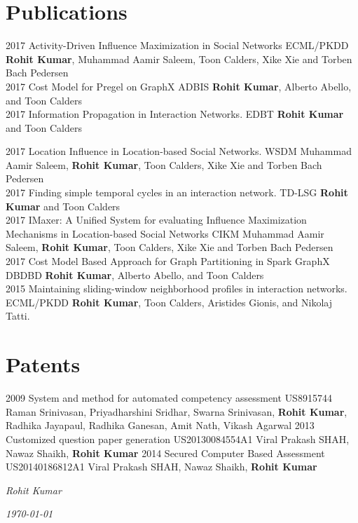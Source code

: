 \documentclass[]{cv-class}
\begin{document}
\section{Publications}
\begin{entrylist}
	\entry
	{2017}
	{Activity-Driven Influence Maximization in Social Networks}
	{ECML/PKDD}
	{\textbf{Rohit Kumar}, Muhammad Aamir Saleem, Toon Calders, Xike Xie and Torben Bach Pedersen\\}
	\entry
	{2017}
	{Cost Model for Pregel on GraphX}
	{ADBIS}
	{\textbf{Rohit Kumar}, Alberto Abello, and Toon Calders\\}
		\entry
	{2017}
	{Information Propagation in Interaction Networks.}
	{EDBT}
	{\textbf{Rohit Kumar} and Toon Calders\\}
		
	\end{entrylist}
	\begin{entrylist}
	\entry
	{2017}
	{Location Influence in Location-based Social Networks.}
	{WSDM}
	{Muhammad Aamir Saleem, \textbf{Rohit Kumar}, Toon Calders, Xike Xie and Torben Bach Pedersen\\}
	\entry
	{2017}
	{Finding simple temporal cycles in an interaction network.}
	{TD-LSG}
	{\textbf{Rohit Kumar} and Toon Calders\\}
	\entry
	{2017}
	{IMaxer: A Unified System for evaluating Influence Maximization Mechanisms in Location-based Social Networks}
	{CIKM}
	{Muhammad Aamir Saleem, \textbf{Rohit Kumar}, Toon Calders, Xike Xie and Torben Bach Pedersen\\}
	\entry
	{2017}
	{Cost Model Based Approach for Graph Partitioning in Spark GraphX}
	{DBDBD}
	{\textbf{Rohit Kumar}, Alberto Abello, and Toon Calders\\}
	\entry
	{2015}
	{Maintaining sliding-window neighborhood profiles in interaction networks.}
	{ECML/PKDD}
	{\textbf{Rohit Kumar}, Toon Calders, Aristides Gionis, and Nikolaj Tatti.\\}
	\end{entrylist}
	\section{Patents}
	\begin{entrylist}
	\entry
	{2009}
	{System and method for automated competency assessment}
	{US8915744}
	{Raman Srinivasan, Priyadharshini Sridhar, Swarna Srinivasan, \textbf{Rohit Kumar}, Radhika Jayapaul, Radhika Ganesan, Amit Nath, Vikash Agarwal}
	\entry
	{2013}
	{Customized question paper generation}
	{US20130084554A1}
	{Viral Prakash SHAH, Nawaz Shaikh,\textbf{ Rohit Kumar}}
	\entry
	{2014}
	{Secured Computer Based Assessment}
	{US20140186812A1}
	{Viral Prakash SHAH, Nawaz Shaikh,\textbf{ Rohit Kumar}}
	\end{entrylist}

\vspace{1.5cm}
\begin{flushright}
\emph{Rohit Kumar}
\end{flushright}
\begin{flushright}
\emph{\today}
\end{flushright}
\end{document}
